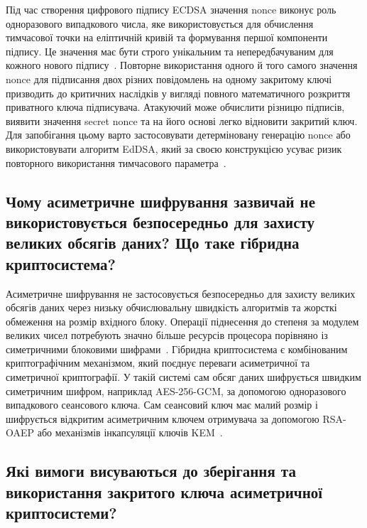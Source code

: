 Під час створення цифрового підпису ECDSA значення nonce виконує роль одноразового випадкового числа,
яке використовується для обчислення тимчасової точки на еліптичній кривій та формування першої
компоненти підпису. Це значення має бути строго унікальним та непередбачуваним для кожного нового
підпису~\cite{RFC6979}. Повторне використання одного й того самого значення nonce для підписання двох
різних повідомлень на одному закритому ключі призводить до критичних наслідків у вигляді повного
математичного розкриття приватного ключа підписувача. Атакуючий може обчислити різницю підписів,
виявити значення secret nonce та на його основі легко відновити закритий ключ. Для запобігання цьому варто
застосовувати детерміновану генерацію nonce або використовувати алгоритм EdDSA, який за своєю
конструкцією усуває ризик повторного використання тимчасового
параметра~\cite{RFC6979,RFC8032,cryptography}.

\subsection{Чому асиметричне шифрування зазвичай не використовується безпосередньо для захисту великих обсягів даних? Що таке гібридна криптосистема?}

Асиметричне шифрування не застосовується безпосередньо для захисту великих обсягів даних через низьку
обчислювальну швидкість алгоритмів та жорсткі обмеження на розмір вхідного блоку. Операції піднесення
до степеня за модулем великих чисел потребують значно більше ресурсів процесора порівняно із
симетричними блоковими шифрами~\cite{NIST80057}. Гібридна криптосистема є комбінованим
криптографічним механізмом, який поєднує переваги асиметричної та симетричної криптографії. У такій
системі сам обсяг даних шифрується швидким симетричним шифром, наприклад AES-256-GCM, за допомогою
одноразового випадкового сеансового ключа. Сам сеансовий ключ має малий розмір і шифрується відкритим
асиметричним ключем отримувача за допомогою RSA-OAEP або механізмів інкапсуляції ключів
KEM~\cite{NIST80057,RFC8017}.


\subsection{Які вимоги висуваються до зберігання та використання закритого ключа асиметричної криптосистеми?}

